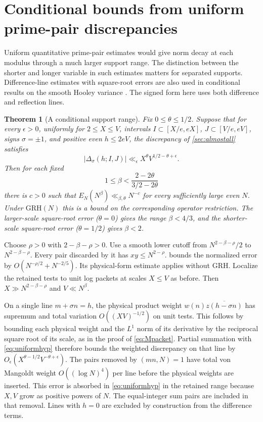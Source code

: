\documentclass[11pt,a4paper]{article}
\numberwithin{equation}{section}
\newtheorem{theorem}{Theorem}[section]
\newcommand{\grh}{\mathrm{GRH}}
\begin{document}
\section{Conditional bounds from uniform prime-pair discrepancies}
\label{sec:pairconditional}

Uniform quantitative prime-pair estimates would give norm
decay at each modulus through a much larger support range.
The distinction between the shorter and longer variable in
such estimates matters for separated supports. Difference-line
estimates with square-root errors are also used in conditional
results on the smooth Hooley variance \cite[Theorem~4]{TZLiu}.
The signed form here uses both difference and reflection lines.

\begin{theorem}[A conditional support range]
\label{thm:pairconditional}
Fix $0\le\theta\le1/2$. Suppose that for every $\epsilon>0$,
uniformly for $2\le X\le V$, intervals
$I\subset[X/e,eX]$, $J\subset[V/e,eV]$, signs $\sigma=\pm1$,
and positive even $h\le2eV$, the discrepancy of
\cref{sec:almostall} satisfies
\begin{equation}
 |\Delta_\sigma(h;I,J)|
       \ll_\epsilon X^\theta V^{1/2-\theta+\epsilon}.
 \label{eq:uniformhyp}
\end{equation}
Then for each fixed
\[
       1\le\beta<\frac{2-2\theta}{3/2-2\theta}
\]
there is $c>0$ such that $E_N(N^\beta)\ll_{\beta,\theta} N^{-c}$
for every sufficiently large even $N$. Under $\grh(N)$ this
is a bound on the corresponding operator restriction.
The larger-scale square-root error ($\theta=0$) gives the
range $\beta<4/3$, and the shorter-scale square-root error
($\theta=1/2$) gives $\beta<2$.
\end{theorem}

Choose $\rho>0$ with $2-\beta-\rho>0$. Use a smooth lower
cutoff from $N^{2-\beta-\rho}/2$ to $N^{2-\beta-\rho}$.
Every pair discarded by it has $xy\le N^{2-\rho}$.
 bounds the normalized error by
$O(N^{-\rho/2}+N^{-2/5})$. Its physical-form estimate
applies without GRH. Localize the retained tests to unit
log packets at scales $X\le V$ as before. Then
$X\gg N^{2-\beta-\rho}$ and $V\ll N^\beta$.

On a single line $m+\sigma n=h$, the physical product
weight $w(n)\overline{z(h-\sigma n)}$ has supremum and total
variation $O((XV)^{-1/2})$ on unit tests. This follows by
bounding each physical weight and the $L^1$ norm of its
derivative by the reciprocal square root of its scale,
as in the proof of \cref{eq:Mpacket}. Partial summation
with \cref{eq:uniformhyp} therefore bounds the weighted
discrepancy on that line by
$O_\epsilon(X^{\theta-1/2}V^{-\theta+\epsilon})$.
The pairs removed by $(mn,N)=1$ have total von Mangoldt
weight $O((\log N)^4)$ per line before the physical weights
are inserted. This error is absorbed in \cref{eq:uniformhyp}
in the retained range because $X,V$ grow as positive powers
of $N$. The equal-integer sum pairs are included in that
removal. Lines with $h=0$ are excluded by construction
from the difference terms.
\end{document}
